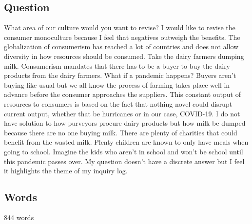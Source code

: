 \documentclass[a4paper,man,biblatex]{apa6}
\begin{document}
\subsection{Question} What area of our culture would you want to revise? I would like to revise the consumer monoculture because I feel that negatives outweigh the benefits. The globalization of consumerism has reached a lot of countries and does not allow diversity in how resources should be consumed. Take the dairy farmers dumping milk. Consumerism mandates that there has to be a buyer to buy the dairy products from the dairy farmers. What if a pandemic happens? Buyers aren't buying like usual but we all know the process of farming takes place well in advance before the consumer approaches the suppliers. This constant output of resources to consumers is based on the fact that nothing novel could disrupt current output, whether that be hurricanes or in our case, COVID-19. I do not have solution to how purveyors procure dairy products but how milk be dumped because there are no one buying milk. There are plenty of charities that could benefit from the wasted milk. Plenty children are known to only have meals when going to school. Imagine the kids who aren't in school and won't be school until this pandemic passes over. My question doesn't have a discrete answer but I feel it highlights the theme of my inquiry log. 

\subsection{Words} 844 words

\printbibliography
\end{document}
